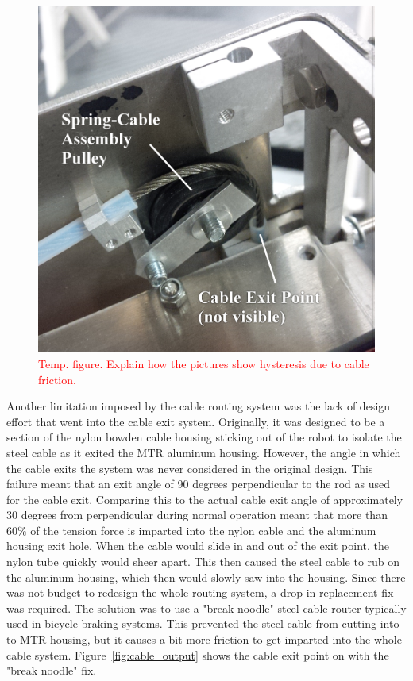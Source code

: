 \begin{appendices}
\begin{figure}[thpb]
      \centering
      \includegraphics[width=0.6\columnwidth]{tex/img/cable_pulley_bearing_labelled_fixedfonts}
      \caption{\textcolor{red}{Temp. figure. Explain how the pictures show hysteresis due to cable friction.}}
      \label{fig:cable_friction}
\end{figure}

Another limitation imposed by the cable routing system was the lack of design effort that went into the cable exit system.
Originally, it was designed to be a section of the nylon bowden cable housing sticking out of the robot to isolate the steel cable as it exited the MTR aluminum housing.
However, the angle in which the cable exits the system was never considered in the original \SB{} design. 
This failure meant that an exit angle of 90 degrees perpendicular to the rod as used for the cable exit.
Comparing this to the actual cable exit angle of approximately 30 degrees from perpendicular during normal operation meant that more than \(60\%\) of the tension force is imparted into the nylon cable and the aluminum housing exit hole.
When the cable would slide in and out of the exit point, the nylon tube quickly would sheer apart.
This then caused the steel cable to rub on the aluminum housing, which then would slowly saw into the housing.
Since there was not budget to redesign the whole routing system, a drop in replacement fix was required. 
The solution was to use a "break noodle" steel cable router typically used in bicycle braking systems.
This prevented the steel cable from cutting into to MTR housing, but it causes a bit more friction to get imparted into the whole cable system.
Figure~\ref{fig:cable_output} shows the cable exit point on \SB{} with the "break noodle" fix.


\end{appendices}
